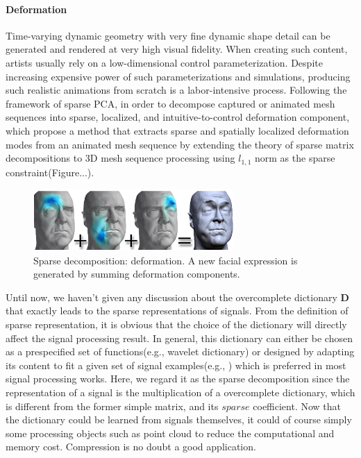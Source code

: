 \paragraph{Deformation}

Time-varying dynamic geometry with very fine dynamic shape detail can be generated and rendered at very high visual fidelity. When creating such content, artists usually rely on a low-dimensional control parameterization. Despite increasing expensive power of such parameterizations and simulations, producing such realistic animations from scratch is a labor-intensive process. Following the framework of  sparse PCA\cite{zou2006sparse,jenatton2011structured}, in order to decompose captured or animated mesh sequences into sparse, localized, and intuitive-to-control deformation component, \cite{neumann2013sparse} which propose a method that extracts sparse and spatially localized deformation modes from an animated mesh sequence by extending the theory of sparse matrix decompositions to 3D mesh sequence processing using $l_{1,1}$ norm as the sparse constraint(Figure...).

\begin{figure}[ht]
  \centering
  \includegraphics[width=3in]{images/localdefor_learning}
  \caption{Sparse decomposition: deformation\cite{neumann2013sparse}. A new facial expression is generated by summing deformation components.}
\end{figure}


Until now, we haven't given any discussion about the overcomplete dictionary $\mathbf{D}$ that exactly leads to the sparse representations of signals. From the definition of sparse representation, it is obvious that the choice of the dictionary will directly affect the signal processing result. In general, this dictionary can either be chosen as a prespecified set of functions(e.g., wavelet dictionary) or designed by adapting its content to fit a given set of signal examples(e.g., \cite{aharon2006svd}) which is preferred in most signal processing works. Here, we regard it as the sparse decomposition since the representation of a signal is the multiplication of a overcomplete dictionary, which is different from the former simple matrix, and its $sparse$ coefficient. Now that the dictionary could be learned from signals themselves, it could of course simply some processing objects such as point cloud to reduce the computational and memory cost. Compression is no doubt a good application.

